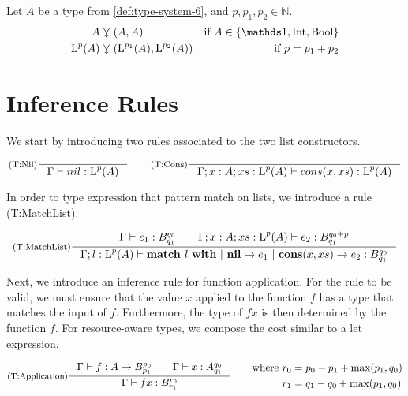 \begin{definition}
   Let \(A\) be a type from \cref{def:type-system-6}, and \(p, p_1, p_2 \in \mathbb{N}\).
   \begin{align*}
      A &\shares (A, A)                                           &\text{if } A \in \{\unit, \typeint, \bool\}\\
      \ralist{p}{A} &\shares (\ralist{p_1}{A}, \ralist{p_2}{A})   &\text{if } p = p_1 + p_2 
   \end{align*}
\end{definition}

\section{Inference Rules}

We start by introducing two rules associated to the two list constructors. 

\[
   \inference[(T:Nil)]
   {}
   {\typing{\Gamma}{nil}{\ralist{p}{A}}}
   \qquad
   \inference[(T:Cons)]
   {}
   {\typing{\Gamma;x : A; xs : \ralist{p}{A}}{cons(x, xs)}{\ralist{p}{A}}}
\]

In order to type expression that pattern match on lists, we introduce a rule (T:MatchList). 

\[
   \inference[(T:MatchList)]
   {\typing{\Gamma}{e_1}{\ratype{B}{q_0}{q_1}} \qquad \typing{\Gamma;x : A; xs : \ralist{p}{A}}{e_2}{\ratype{B}{q_0 + p}{q_1}}}
   {\typing{\Gamma;l : \ralist{p}{A}}{\listmatch{l}{e_1}{e_2}}{\ratype{B}{q_0}{q_1}}}
\]

Next, we introduce an inference rule for function application. For the rule to be valid, we must ensure that the value \(x\) applied to the function \(f\) has a type that matches the input of \(f\). Furthermore, the type of \(f x\) is then determined by the function \(f\). For resource-aware types, we compose the cost similar to a let expression. 

\[
   \inference[(T:Application)]
   {\typing{\Gamma}{f}{\rafunc{A}{B}{p_0}{p_1}} \qquad \typing{\Gamma}{x}{\ratype{A}{q_0}{q_1}}}
   {\typing{\Gamma}{f x}{\ratype{B}{r_0}{r_1}}}
   \qquad
   \begin{aligned}
      \text{where }  & r_0 = p_0 - p_1 + \max(p_1, q_0)\\
                     & r_1 = q_1 - q_0 + \max(p_1, q_0)
   \end{aligned}
\]


